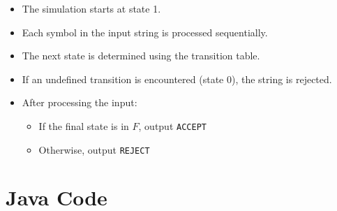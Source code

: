 \documentclass[11pt]{article}
\begin{document}
\begin{itemize}
    \item The simulation starts at state 1.
    \item Each symbol in the input string is processed sequentially.
    \item The next state is determined using the transition table.
    \item If an undefined transition is encountered (state 0), the string is rejected.
    \item After processing the input:
    \begin{itemize}
        \item If the final state is in $F$, output \texttt{ACCEPT}
        \item Otherwise, output \texttt{REJECT}
    \end{itemize}
\end{itemize}

\newpage

\section*{Java Code}
\end{document}
